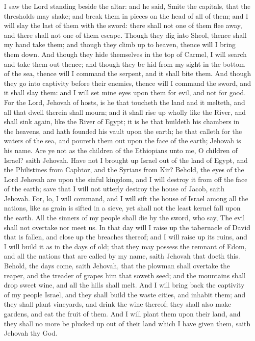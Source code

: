 I saw the Lord standing beside the altar: and he said, Smite the capitals, that the thresholds may shake; and break them in pieces on the head of all of them; and I will slay the last of them with the sword: there shall not one of them flee away, and there shall not one of them escape. Though they dig into Sheol, thence shall my hand take them; and though they climb up to heaven, thence will I bring them down. And though they hide themselves in the top of Carmel, I will search and take them out thence; and though they be hid from my sight in the bottom of the sea, thence will I command the serpent, and it shall bite them. And though they go into captivity before their enemies, thence will I command the sword, and it shall slay them: and I will set mine eyes upon them for evil, and not for good.  For the Lord, Jehovah of hosts, is he that toucheth the land and it melteth, and all that dwell therein shall mourn; and it shall rise up wholly like the River, and shall sink again, like the River of Egypt; it is he that buildeth his chambers in the heavens, and hath founded his vault upon the earth; he that calleth for the waters of the sea, and poureth them out upon the face of the earth; Jehovah is his name.  Are ye not as the children of the Ethiopians unto me, O children of Israel? saith Jehovah. Have not I brought up Israel out of the land of Egypt, and the Philistines from Caphtor, and the Syrians from Kir? Behold, the eyes of the Lord Jehovah are upon the sinful kingdom, and I will destroy it from off the face of the earth; save that I will not utterly destroy the house of Jacob, saith Jehovah. For, lo, I will command, and I will sift the house of Israel among all the nations, like as grain is sifted in a sieve, yet shall not the least kernel fall upon the earth. All the sinners of my people shall die by the sword, who say, The evil shall not overtake nor meet us.  In that day will I raise up the tabernacle of David that is fallen, and close up the breaches thereof; and I will raise up its ruins, and I will build it as in the days of old; that they may possess the remnant of Edom, and all the nations that are called by my name, saith Jehovah that doeth this. Behold, the days come, saith Jehovah, that the plowman shall overtake the reaper, and the treader of grapes him that soweth seed; and the mountains shall drop sweet wine, and all the hills shall melt. And I will bring back the captivity of my people Israel, and they shall build the waste cities, and inhabit them; and they shall plant vineyards, and drink the wine thereof; they shall also make gardens, and eat the fruit of them. And I will plant them upon their land, and they shall no more be plucked up out of their land which I have given them, saith Jehovah thy God. 